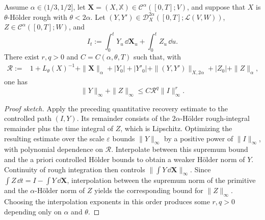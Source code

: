 \begin{thm}
Assume $\alpha\in(1/3,1/2]$, let
$\mathbf X=(X,\mathbb X)\in\mathscr C^\alpha([0,T];V)$, and suppose that $X$
is $\theta$-Hölder rough with $\theta<2\alpha$.  Let
$(Y,Y')\in\mathscr D_X^{2\alpha}([0,T];\mathcal L(V,W))$,
$Z\in\mathcal C^\alpha([0,T];W)$, and
\[
  I_t:=\int_0^tY_u\,\dd\mathbf X_u+\int_0^tZ_u\,\dd u.
\]
There exist $r,q>0$ and $C=C(\alpha,\theta,T)$ such that, with
\begin{align*}
\mathcal R:={}&1+L_\theta(X)^{-1}+\|\mathbf X\|_\alpha
 +|Y_0|+|Y'_0|+\|(Y,Y')\|_{X,2\alpha}
 +|Z_0|+\|Z\|_\alpha,
\end{align*}
one has
\[
  \|Y\|_\infty+\|Z\|_\infty
  \le C\mathcal R^q\|I\|_\infty^r.
\]
\end{thm}

\begin{proof}[Proof sketch]
Apply the preceding quantitative recovery estimate to the controlled path
$(I,Y)$.  Its remainder consists of the $2\alpha$-Hölder rough-integral
remainder plus the time integral of $Z$, which is Lipschitz.  Optimizing the
resulting estimate over the scale $\varepsilon$ bounds $\|Y\|_\infty$ by a
positive power of $\|I\|_\infty$, with polynomial dependence on $\mathcal R$.
Interpolate between this supremum bound and the a priori controlled Hölder
bounds to obtain a weaker Hölder norm of $Y$.  Continuity of rough integration
then controls $\|\int Y\,\dd\mathbf X\|_\infty$.  Since
$\int Z\,\dd t=I-\int Y\,\dd\mathbf X$, interpolation between the supremum norm
of the primitive and the $\alpha$-Hölder norm of $Z$ yields the corresponding
bound for $\|Z\|_\infty$.  Choosing the interpolation exponents in this order
produces some $r,q>0$ depending only on $\alpha$ and $\theta$.
\end{proof}

